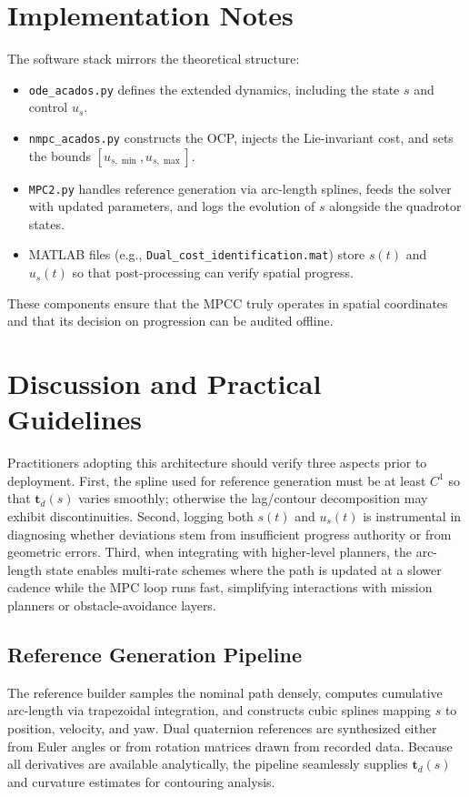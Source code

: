 \documentclass[letterpaper, 10pt, conference]{IEEEtran}
\begin{document}
\section{Implementation Notes}
\label{sec:implementation}
The software stack mirrors the theoretical structure:
\begin{itemize}
    \item \texttt{ode\_acados.py} defines the extended dynamics, including the state $s$ and control $u_s$.
    \item \texttt{nmpc\_acados.py} constructs the OCP, injects the Lie-invariant cost, and sets the bounds $[u_{s,\min}, u_{s,\max}]$.
    \item \texttt{MPC2.py} handles reference generation via arc-length splines, feeds the solver with updated parameters, and logs the evolution of $s$ alongside the quadrotor states.
    \item MATLAB files (e.g., \texttt{Dual\_cost\_identification.mat}) store $s(t)$ and $u_s(t)$ so that post-processing can verify spatial progress.
\end{itemize}
These components ensure that the MPCC truly operates in spatial coordinates and that its decision on progression can be audited offline.

\section{Discussion and Practical Guidelines}
\label{sec:discussion}
Practitioners adopting this architecture should verify three aspects prior to deployment. First, the spline used for reference generation must be at least $C^1$ so that $\mathbf{t}_d(s)$ varies smoothly; otherwise the lag/contour decomposition may exhibit discontinuities. Second, logging both $s(t)$ and $u_s(t)$ is instrumental in diagnosing whether deviations stem from insufficient progress authority or from geometric errors. Third, when integrating with higher-level planners, the arc-length state enables multi-rate schemes where the path is updated at a slower cadence while the MPC loop runs fast, simplifying interactions with mission planners or obstacle-avoidance layers.

\subsection{Reference Generation Pipeline}
The reference builder samples the nominal path densely, computes cumulative arc-length via trapezoidal integration, and constructs cubic splines mapping $s$ to position, velocity, and yaw. Dual quaternion references are synthesized either from Euler angles or from rotation matrices drawn from recorded data. Because all derivatives are available analytically, the pipeline seamlessly supplies $\mathbf{t}_d(s)$ and curvature estimates for contouring analysis.
\end{document}
